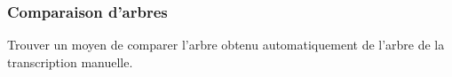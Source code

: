 \subsubsection{Comparaison d’arbres}

Trouver un moyen de comparer l’arbre obtenu automatiquement de l’arbre de la transcription manuelle.
